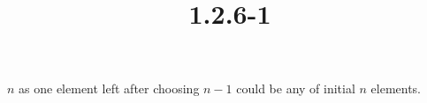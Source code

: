 \documentclass{article}
\title{1.2.6-1}
\begin{document}
\maketitle

\( n \) as one element left after choosing \( n - 1 \) could be any of initial \( n \) elements.
\end{document}
